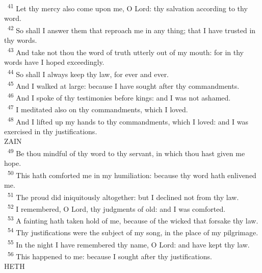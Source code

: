 \documentclass[a5paper,12pt]{article}
\begin{document}
\begin{multicols*}{2}
~\textsuperscript{41} Let thy mercy also come upon me, O Lord: thy salvation according to thy word.\\
~\textsuperscript{42} So shall I answer them that reproach me in any thing; that I have trusted in thy words.\\
~\textsuperscript{43} And take not thou the word of truth utterly out of my mouth: for in thy words have I hoped exceedingly.\\
~\textsuperscript{44} So shall I always keep thy law, for ever and ever.\\
~\textsuperscript{45} And I walked at large: because I have sought after thy commandments.\\
~\textsuperscript{46} And I spoke of thy testimonies before kings: and I was not ashamed.\\
~\textsuperscript{47} I meditated also on thy commandments, which I loved.\\
~\textsuperscript{48} And I lifted up my hands to thy commandments, which I loved: and I was exercised in thy justifications.\\

ZAIN\\

~\textsuperscript{49} Be thou mindful of thy word to thy servant, in which thou hast given me hope.\\
~\textsuperscript{50} This hath comforted me in my humiliation: because thy word hath enlivened me.\\
~\textsuperscript{51} The proud did iniquitously altogether: but I declined not from thy law.\\
~\textsuperscript{52} I remembered, O Lord, thy judgments of old: and I was comforted.\\
~\textsuperscript{53} A fainting hath taken hold of me, because of the wicked that forsake thy law.\\
~\textsuperscript{54} Thy justifications were the subject of my song, in the place of my pilgrimage.\\
~\textsuperscript{55} In the night I have remembered thy name, O Lord: and have kept thy law.\\
~\textsuperscript{56} This happened to me: because I sought after thy justifications.\\

HETH\\


\end{multicols*}
\end{document}
